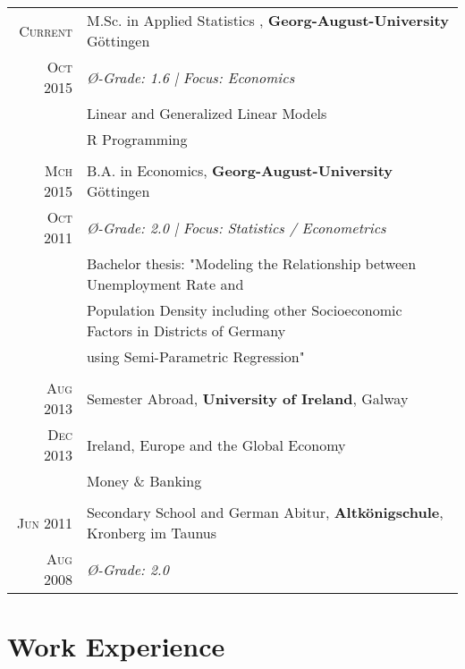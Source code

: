 \documentclass[a4paper,10pt]{article} %
\begin{document}
\begin{tabular}{rl}
\textsc{Current}& M.Sc. in Applied Statistics , \textbf{Georg-August-University} Göttingen\\
\textsc{Oct 2015}& \emph{{{\O}}-Grade: 1.6 | Focus: Economics}\\
& \footnotesize{Linear and Generalized Linear Models} \\
& \footnotesize{R Programming} \\
&\\




\textsc{Mch 2015}& B.A. in Economics, \textbf{Georg-August-University} Göttingen\\
\textsc{Oct 2011}& \emph{{{\O}}-Grade: 2.0 | Focus: Statistics / Econometrics}\\
&\footnotesize{Bachelor thesis: "Modeling the Relationship between
Unemployment Rate and}\\
&\footnotesize{Population Density including other
Socioeconomic Factors in Districts of
Germany}\\
& \footnotesize{using Semi-Parametric Regression"} \\
&\\


\textsc{Aug 2013} & Semester Abroad, \textbf{University of Ireland}, Galway\\
\textsc{Dec 2013} & \footnotesize{Ireland, Europe and the Global Economy}\\
& \footnotesize{Money \& Banking} \\
&\\

\textsc{Jun 2011} & Secondary School and German Abitur, \textbf{Altkönigschule}, Kronberg im Taunus\\
\textsc{Aug 2008}& \emph{{\O}-Grade: 2.0}\\

\end{tabular}


\section{Work Experience}
\end{document}
